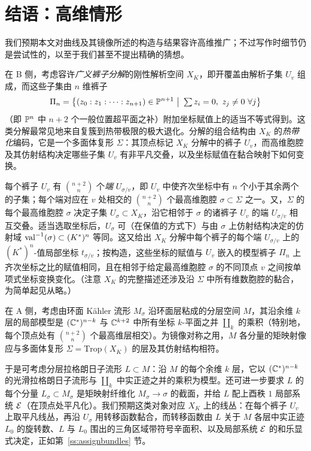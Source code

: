 \section{结语：高维情形}\label{s:higherdim}

我们预期本文对曲线及其镜像所述的构造与结果容许高维推广；不过写作时细节仍是尝试性的，以至于我们甚至不提出精确的猜想。

在 B 侧，考虑容许\emph{广义裤子分解}的刚性解析空间 $X_K$，即开覆盖由解析子集 $U_v$ 组成，而这些子集由 $n$ 维裤子
\[
\Pi_n=\bigl\{(z_0:z_1:\dots:z_{n+1})\in \mathbb{P}^{n+1}\ \big|\ \textstyle\sum z_i=0,\ z_j\neq 0\ \forall j\bigr\}
\]
（即 $\mathbb{P}^n$ 中 $n+2$ 个一般位置超平面之补）附加坐标赋值上的适当不等式得到。这类分解最常见地来自复簇到热带极限的极大退化。分解的组合结构由 $X_K$ 的\emph{热带化}编码，它是一个多面体复形 $\Sigma$：其顶点标记 $X_K$ 分解中的裤子 $U_v$，而高维胞腔及其仿射结构决定哪些子集 $U_v$ 有非平凡交叠，以及坐标赋值在黏合映射下如何变换。

每个裤子 $U_v$ 有 $\binom{n+2}{n}$ 个\emph{端} $U_{\sigma/v}$，即 $U_v$ 中使齐次坐标中有 $n$ 个小于其余两个的子集；每个端对应在 $v$ 处相交的 $\binom{n+2}{n}$ 个最高维胞腔 $\sigma\subset \Sigma$ 之一。又，$\Sigma$ 的每个最高维胞腔 $\sigma$ 决定子集 $U_\sigma\subset X_K$，沿它相邻于 $\sigma$ 的诸裤子 $U_v$ 的端 $U_{\sigma/v}$ 相互交叠。适当选取坐标后，$U_\sigma$ 可（在保值的方式下）与由 $\sigma$ 上仿射结构决定的仿射域 $\operatorname{val}^{-1}(\sigma)\subset (K^*)^n$ 等同。这又给出 $X_K$ 分解中每个裤子的每个端 $U_{\sigma/v}$ 上的 $(K^*)^n$-值局部坐标 $t_{\sigma/v}$；按构造，这些坐标的赋值与 $U_v$ 嵌入的模型裤子 $\Pi_n$ 上齐次坐标之比的赋值相同，且在相邻于给定最高维胞腔 $\sigma$ 的不同顶点 $v$ 之间按单项式坐标变换变化。（注意 $X_K$ 的完整描述还涉及沿 $\Sigma$ 中所有维数胞腔的黏合，为简单起见从略。）

在 A 侧，考虑由环面 K\"ahler 流形 $M_\sigma$ 沿环面层粘成的分层空间 $M$，其沿余维 $k$ 层的局部模型是 $(\mathbb{C}^*)^{n-k}$ 与 $\mathbb{C}^{k+2}$ 中所有坐标 $k$-平面之并 $\amalg_k$ 的乘积（特别地，每个顶点处有 $\binom{n+2}{n}$ 个最高维层相交）。为镜像对称之用，$M$ 各分量的矩映射像应与多面体复形 $\Sigma=\mathrm{Trop}(X_K)$ 的层及其仿射结构相符。

于是可考虑分层拉格朗日子流形 $L\subset M$：沿 $M$ 的每个余维 $k$ 层，它以 $(\mathbb{C}^*)^{n-k}$ 的光滑拉格朗日子流形与 $\amalg_k$ 中实正迹之并的乘积为模型。还可进一步要求 $L$ 的每个分量 $L_\sigma\subset M_\sigma$ 是矩映射纤维化 $M_\sigma\to \sigma$ 的截面，并给 $L$ 配上酉秩 $1$ 局部系统 $\mathcal{E}$（在顶点处平凡化）。我们预期这类对象对应 $X_K$ 上的线丛：在每个裤子 $U_v$ 上取平凡线丛，再沿 $U_\sigma$ 用转移函数黏合，而转移函数由 $L$ 关于 $M$ 各层中实正迹 $L_0$ 的旋转数、$L$ 与 $L_0$ 围出的三角区域带符号辛面积、以及局部系统 $\mathcal{E}$ 的和乐显式决定，正如第~\ref{ss:assignbundles} 节。

